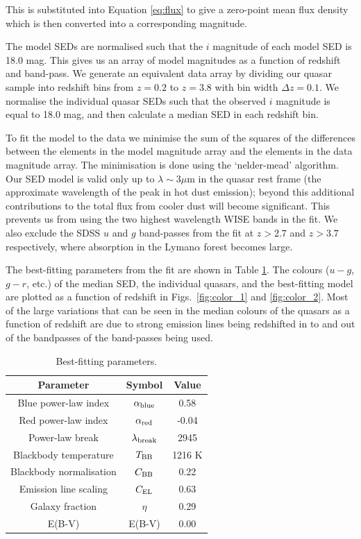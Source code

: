 This is substituted into Equation \ref{eq:flux} to give a zero-point mean flux density which is then converted into a corresponding magnitude.  

The model SEDs are normalised such that the $i$ magnitude of each model SED is 18.0 mag. 
This gives us an array of model magnitudes as a function of redshift and band-pass. 
We generate an equivalent data array by dividing our quasar sample into redshift bins from $z=0.2$ to $z=3.8$ with bin width $\Delta z = 0.1$. 
We normalise the individual quasar SEDs such that the observed $i$ magnitude is equal to 18.0 mag, and then calculate a median SED in each redshift bin. 

To fit the model to the data we minimise the sum of the squares of the differences between the elements in the model magnitude array and the elements in the data magnitude array. 
The minimisation is done using the `nelder-mead' algorithm. 
Our SED model is valid only up to $\lambda \sim 3\mu$m in the quasar rest frame (the approximate wavelength of the peak in hot dust emission); beyond this additional contributions to the total flux from cooler dust will become significant. 
This prevents us from using the two highest wavelength WISE bands in the fit. 
We also exclude the SDSS $u$ and $g$ band-passes from the fit at $z > 2.7$ and $z > 3.7$ respectively, where absorption in the Lyman$\alpha$ forest becomes large. 

The best-fitting parameters from the fit are shown in Table \ref{tab:params}. 
The colours ($u - g$, $g - r$, etc.) of the median SED, the individual quasars, and the best-fitting model are plotted as a function of redshift in Figs.~\ref{fig:color_1} and \ref{fig:color_2}.  
Most of the large variations that can be seen in the median colours of the quasars as a function of redshift are due to strong emission lines being redshifted in to and out of the bandpasses of the band-passes being used. 

\begin{table}
  \centering
  \begin{tabular}{c c c}
    \hline 
    Parameter & Symbol & Value \\
    \hline 
    Blue power-law index & $\alpha_{\rm blue}$ & 0.58 \\
    Red power-law index & $\alpha_{\rm red}$ & -0.04 \\
    Power-law break & $\lambda_{\rm break}$ & 2945 \\
    Blackbody temperature & $T_{\rm BB}$ & 1216 K \\
    Blackbody normalisation & $C_{\rm BB}$ & 0.22 \\
    Emission line scaling & $C_{\rm EL}$  & 0.63 \\
    Galaxy fraction & $\eta$ & 0.29 \\
    E(B-V) & E(B-V) & 0.00 \\
    \hline
  \end{tabular}
  \caption{Best-fitting parameters.}
  \label{tab:params}
\end{table}

